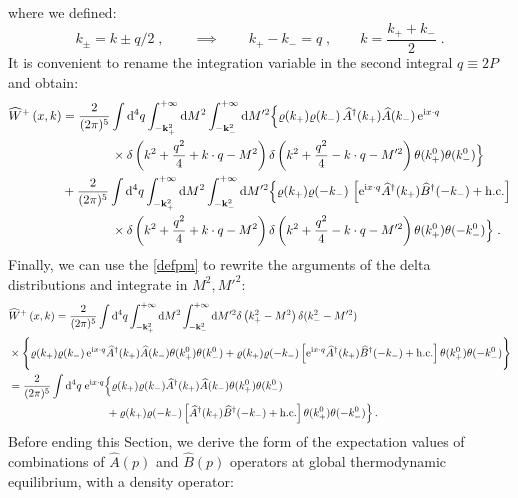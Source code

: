 \documentclass[prd,superscriptaddress,nofootinbib,notitlepage]{revtex4-1}
\def\wA{{\widehat A}}
\def\wB{{\widehat B}}
\def\wA{\widehat A}
\def\wAd{\widehat A^{\dagger}}
\def\wB{\widehat B}
\def\wBd{\widehat B^{\dagger}}
\def\wW{\widehat W}
\newcommand{\e}{{\rm e}}
\newcommand{\di}{{\rm d}}
\newcommand{\ii}{{\rm i}}
\newcommand{\be}{\begin{equation}}
\newcommand{\ee}{\end{equation}}
\begin{document}
%
where we defined:
%
\be\label{defpm}
 k_\pm = k \pm q/2\;, \qquad \implies \qquad k_+-k_-=q\;, \qquad k = \frac{k_+ +k_-}{2}\;.
\ee
%
It is convenient to rename the integration variable in the second integral $q\equiv 2P$
and obtain: 
%
\begin{equation*}
    \begin{split}
\wW^+\left(x,k\right)&=\frac{2}{(2\pi)^5}\int\di^4 q\int^{+\infty}_{-{\bf k}^2_+}\di M^2\int^{+\infty}_{-{\bf k}^2_-}
\di M^{\prime 2}\Big\{\varrho(k_+)\varrho(k_-) \, \wAd(k_+)\wA(k_-) 
\, \e^{\ii x\cdot q}\\
&\qquad\qquad\times\delta\left(k^2+\frac{q^2}{4}+k\cdot q-M^2\right)\delta\left(k^2+\frac{q^2}{4}-k\cdot q-M^{\prime2}\right)
\theta(k^0_+)\theta(k^0_-)\Big\} \\
&+ \frac{2}{(2\pi)^5}\int\di^4 q \int^{+\infty}_{-{\bf k}^2_+}\di M^2\int^{+\infty}_{-{\bf k}^2_-}
\di M^{\prime 2}\Big\{\varrho(k_+)\varrho(-k_-) \, \left[\e^{\ii x\cdot q}
\wAd(k_+)\wBd(-k_-)+ {\rm h. c.}\right]\\
&\qquad\qquad\times \delta\left(k^2+\frac{q^2}{4}+k\cdot q-M^2\right)\delta\left(k^2+\frac{q^2}{4}-k\cdot q-M^{\prime2}\right)
\theta(k^0_+)\theta(-k^0_-)\Big\}\;.
\end{split}
\end{equation*}
%
Finally, we can use the \eqref{defpm} to rewrite the arguments of the delta distributions and integrate in $M^2,M'^2$:
%
\begin{align}\label{wigner2}
&\wW^+\left(x,k\right)=\frac{2}{(2\pi)^5}\int\di^4 q\int^{+\infty}_{-{\bf k}^2_+}\di M^2\int^{+\infty}_{-{\bf k}^2_-} 
\di M^{\prime 2} \delta\left(k_+^2-M^2 \right)\delta(k_-^2-M^{\prime 2}) \nonumber \\
&\times\Bigg\{\varrho(k_+)\varrho(k_-)  \, \e^{\ii x\cdot q} \wAd(k_+)\wA(k_-)\theta(k^0_+)\theta(k^0_-) 
+\varrho(k_+)\varrho(-k_-)\left[\e^{\ii x\cdot q} \wAd(k_+)\wBd(-k_-)+ {\rm h. c.}\right]\theta(k^0_+)\theta(-k^0_-)\Bigg\} 
\nonumber \\
& = \frac{2}{(2\pi)^5}\int\di^4 q \;\e^{\ii x\cdot q} \Big\{\varrho(k_+)\varrho(k_-)\wAd(k_+)\wA(k_-)\theta(k^0_+)\theta(k^0_-) \nonumber
\\
&\qquad\quad\qquad\qquad\qquad+\varrho(k_+)\varrho(-k_-)\left[\wAd(k_+)\wBd(-k_-)+ {\rm h. c.}\right]\theta(k^0_+)\theta(-k^0_-)\Big\}\,.
\end{align}
%
Before ending this Section, we derive the form of the expectation values of combinations of $\wA(p)$
and $\wB(p)$ operators at global thermodynamic equilibrium, with a density operator:
\end{document}
